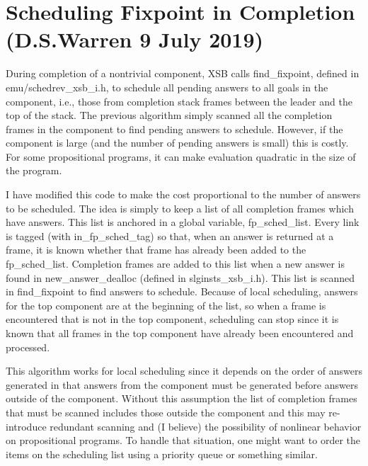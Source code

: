 \section{Scheduling Fixpoint in Completion (D.S.Warren 9 July 2019)} \label{sec:fixpoint}

During completion of a nontrivial component, XSB calls find\_fixpoint,
defined in emu/schedrev\_xsb\_i.h, to schedule all pending answers to
all goals in the component, i.e., those from completion stack frames
between the leader and the top of the stack.  The previous algorithm
simply scanned all the completion frames in the component to find
pending answers to schedule.  However, if the component is large (and
the number of pending answers is small) this is costly.  For some
propositional programs, it can make evaluation quadratic in the size
of the program.

I have modified this code to make the cost proportional to the number
of answers to be scheduled.  The idea is simply to keep a list of all
completion frames which have answers.  This list is anchored in a
global variable, fp\_sched\_list.  Every link is tagged (with
in\_fp\_sched\_tag) so that, when an answer is returned at a frame, it
is known whether that frame has already been added to the
fp\_sched\_list.  Completion frames are added to this list when a new
answer is found in new\_answer\_dealloc (defined in
slginsts\_xsb\_i.h).  This list is scanned in find\_fixpoint to find
answers to schedule.  Because of local scheduling, answers for the top
component are at the beginning of the list, so when a frame is
encountered that is not in the top component, scheduling can stop
since it is known that all frames in the top component have already
been encountered and processed.

This algorithm works for local scheduling since it depends on the order
of answers generated in that answers from the component must be
generated before answers outside of the component.  Without this
assumption the list of completion frames that must be scanned includes
those outside the component and this may re-introduce redundant
scanning and (I believe) the possibility of nonlinear behavior on
propositional programs.  To handle that situation, one might want to
order the items on the scheduling list using a priority queue or
something similar.


